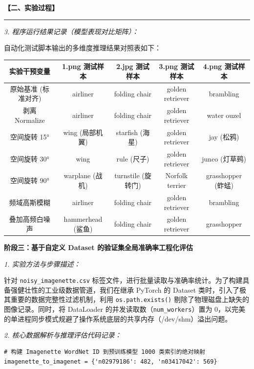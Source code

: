\documentclass[a4paper,12pt]{article}
\newenvironment{sectionbox}[1]
{%
    \begin{center}
    \fboxrule=1pt
    \fboxsep=8pt
    \begin{minipage}{0.98\textwidth}
    \textbf{#1}
    \par\vspace{4pt}
    \hrule
    \vspace{6pt}
}
{%
    \end{minipage}
    \end{center}
}
\begin{document}
\begin{sectionbox}{【二、实验过程】}
\vspace{4pt}
\textit{3. 程序运行结果记录（模型表现对比矩阵）：}

自动化测试脚本输出的多维度推理结果对照表如下：

\begin{center}
\renewcommand{\arraystretch}{1.3}
\begin{tabular}{|c|c|c|c|c|}
\hline
\textbf{实验干预变量} & \textbf{1.png 测试样本} & \textbf{2.jpg 测试样本} & \textbf{3.png 测试样本} & \textbf{4.png 测试样本} \\
\hline
原始基准 (标准对齐) & airliner & folding chair & golden retriever & brambling \\
\hline
剥离 Normalize & airliner & folding chair & golden retriever & water ouzel \\
\hline
空间旋转 15° & wing (局部机翼) & starfish (海星) & golden retriever & jay (松鸦) \\
\hline
空间旋转 30° & wing & rule (尺子) & golden retriever & junco (灯草鹀) \\
\hline
空间旋转 90° & warplane (战机) & turnstile (旋转门) & Norfolk terrier & grasshopper (蚱蜢) \\
\hline
频域高斯模糊 & airliner & folding chair & golden retriever & brambling \\
\hline
叠加高频白噪声 & hammerhead (鲨鱼) & folding chair & golden retriever & grasshopper \\
\hline
\end{tabular}
\end{center}

\vspace{6pt}
\textbf{阶段三：基于自定义 Dataset 的验证集全局准确率工程化评估}

\vspace{4pt}
\textit{1. 实验方法与步骤描述：}

针对 \texttt{noisy\_imagenette.csv} 标签文件，进行批量读取与准确率统计。为了构建具备强健壮性的工业级数据管道，我们在继承 PyTorch 的 Dataset 类时，引入了极其重要的数据完整性过滤机制，利用 \texttt{os.path.exists()} 剔除了物理磁盘上缺失的图像记录。同时，将 DataLoader 的并发读取数（\texttt{num\_workers}）置为 0，以完美的单进程同步模式规避了操作系统底层的共享内存（/dev/shm）溢出问题。

\vspace{4pt}
\textit{2. 核心数据解析与推理评估代码记录：}

\begin{lstlisting}
# 构建 Imagenette WordNet ID 到预训练模型 1000 类索引的绝对映射
imagenette_to_imagenet = {'n02979186': 482, 'n03417042': 569}


\end{lstlisting}
\end{sectionbox}
\end{document}
